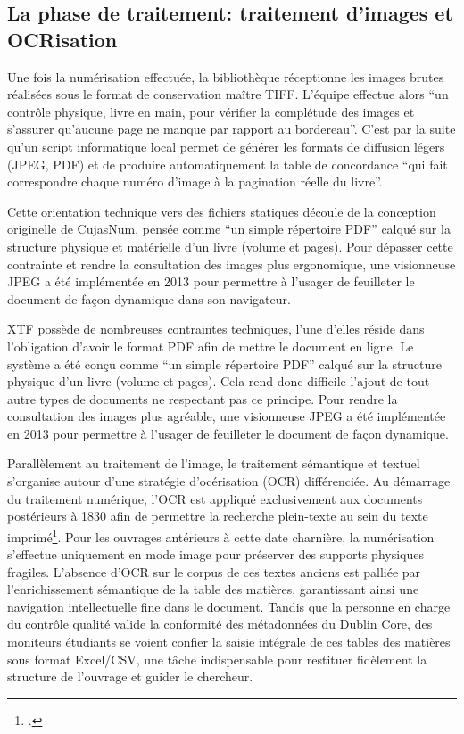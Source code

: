 \subsection{La phase de traitement: traitement d'images et OCRisation} 
Une fois la numérisation effectuée, la bibliothèque réceptionne les images brutes réalisées sous le format de conservation maître \ac{TIFF}. L'équipe effectue alors \enquote{un contrôle physique, livre en main, pour vérifier la complétude des images et s'assurer qu'aucune page ne manque par rapport au bordereau}. C'est par la suite qu'un script informatique local permet de générer les formats de diffusion légers (\ac{JPEG}, \ac{PDF}) et de produire automatiquement la table de concordance \enquote{qui fait correspondre chaque numéro d'image à la pagination réelle du livre}. 

Cette orientation technique vers des fichiers statiques découle de la conception originelle de CujasNum, pensée comme \enquote{un simple répertoire \ac{PDF}} calqué sur la structure physique et matérielle d'un livre (volume et pages). Pour dépasser cette contrainte et rendre la consultation des images plus ergonomique, une visionneuse \ac{JPEG} a été implémentée en 2013 pour permettre à l'usager de feuilleter le document de façon dynamique dans son navigateur.

\ac{XTF} possède de nombreuses contraintes techniques, l'une d'elles réside dans l'obligation d'avoir le format \ac{PDF} afin de mettre le document en ligne. Le système a été conçu comme \enquote{un simple répertoire \ac{PDF}} calqué sur la structure physique d'un livre (volume et pages). Cela rend donc difficile l'ajout de tout autre types de documents ne respectant pas ce principe. Pour rendre la consultation des images plus agréable, une visionneuse \ac{JPEG} a été implémentée en 2013 pour permettre à l'usager de feuilleter le document de façon dynamique. 

Parallèlement au traitement de l'image, le traitement sémantique et textuel s'organise autour d'une stratégie d'océrisation (\ac{OCR}) différenciée. Au démarrage du traitement numérique, l'\ac{OCR} est appliqué exclusivement aux documents postérieurs à 1830 afin de permettre la recherche plein-texte au sein du texte imprimé\footcite{2011_programmeNumerisationPar}. Pour les ouvrages antérieurs à cette date charnière, la numérisation s'effectue uniquement en mode image pour préserver des supports physiques fragiles. L'absence d'\ac{OCR} sur le corpus de ces textes anciens est palliée par l'enrichissement sémantique de la table des matières, garantissant ainsi une navigation intellectuelle fine dans le document. Tandis que la personne en charge du contrôle qualité valide la conformité des métadonnées du Dublin Core, des moniteurs étudiants se voient confier la saisie intégrale de ces tables des matières sous format Excel/CSV, une tâche indispensable pour restituer fidèlement la structure de l'ouvrage et guider le chercheur.

